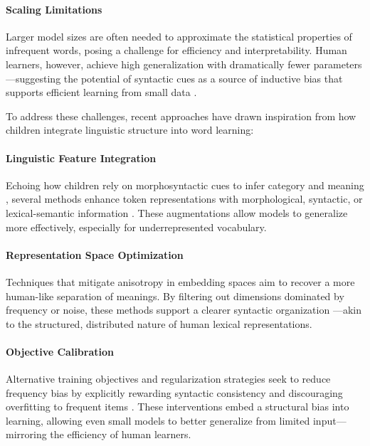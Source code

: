 \paragraph{Scaling Limitations} Larger model sizes are often needed to approximate the statistical properties of infrequent words, posing a challenge for efficiency and interpretability. Human learners, however, achieve high generalization with dramatically fewer parameters—suggesting the potential of syntactic cues as a source of inductive bias that supports efficient learning from small data \citep{tomasello2003constructing, clark2020emergence}.

\vspace{1em}

To address these challenges, recent approaches have drawn inspiration from how children integrate linguistic structure into word learning:

\paragraph{Linguistic Feature Integration} Echoing how children rely on morphosyntactic cues to infer category and meaning \citep{gleitman1990structural, naigles1990children}, several methods enhance token representations with morphological, syntactic, or lexical-semantic information \citep{salle2018incorporating, vulic2017morphfitting, cui2022lert, diehlmartinez2023climb}. These augmentations allow models to generalize more effectively, especially for underrepresented vocabulary.

\paragraph{Representation Space Optimization} Techniques that mitigate anisotropy in embedding spaces aim to recover a more human-like separation of meanings. By filtering out dimensions dominated by frequency or noise, these methods support a clearer syntactic organization \citep{arora2016simple, mu2018all, bis2021too}—akin to the structured, distributed nature of human lexical representations.

\paragraph{Objective Calibration} Alternative training objectives and regularization strategies seek to reduce frequency bias by explicitly rewarding syntactic consistency and discouraging overfitting to frequent items \citep{gong2018frage, gao2018representation}. These interventions embed a structural bias into learning, allowing even small models to better generalize from limited input—mirroring the efficiency of human learners.

